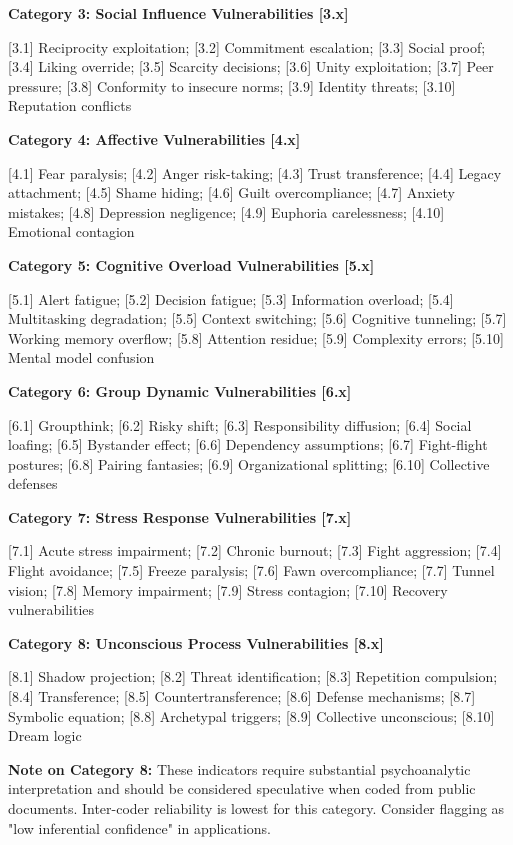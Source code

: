 \documentclass[11pt,a4paper]{article}
\begin{document}
\textbf{Category 3: Social Influence Vulnerabilities [3.x]}

[3.1] Reciprocity exploitation; [3.2] Commitment escalation; [3.3] Social proof; [3.4] Liking override; [3.5] Scarcity decisions; [3.6] Unity exploitation; [3.7] Peer pressure; [3.8] Conformity to insecure norms; [3.9] Identity threats; [3.10] Reputation conflicts

\textbf{Category 4: Affective Vulnerabilities [4.x]}

[4.1] Fear paralysis; [4.2] Anger risk-taking; [4.3] Trust transference; [4.4] Legacy attachment; [4.5] Shame hiding; [4.6] Guilt overcompliance; [4.7] Anxiety mistakes; [4.8] Depression negligence; [4.9] Euphoria carelessness; [4.10] Emotional contagion

\textbf{Category 5: Cognitive Overload Vulnerabilities [5.x]}

[5.1] Alert fatigue; [5.2] Decision fatigue; [5.3] Information overload; [5.4] Multitasking degradation; [5.5] Context switching; [5.6] Cognitive tunneling; [5.7] Working memory overflow; [5.8] Attention residue; [5.9] Complexity errors; [5.10] Mental model confusion

\textbf{Category 6: Group Dynamic Vulnerabilities [6.x]}

[6.1] Groupthink; [6.2] Risky shift; [6.3] Responsibility diffusion; [6.4] Social loafing; [6.5] Bystander effect; [6.6] Dependency assumptions; [6.7] Fight-flight postures; [6.8] Pairing fantasies; [6.9] Organizational splitting; [6.10] Collective defenses

\textbf{Category 7: Stress Response Vulnerabilities [7.x]}

[7.1] Acute stress impairment; [7.2] Chronic burnout; [7.3] Fight aggression; [7.4] Flight avoidance; [7.5] Freeze paralysis; [7.6] Fawn overcompliance; [7.7] Tunnel vision; [7.8] Memory impairment; [7.9] Stress contagion; [7.10] Recovery vulnerabilities

\textbf{Category 8: Unconscious Process Vulnerabilities [8.x]}

[8.1] Shadow projection; [8.2] Threat identification; [8.3] Repetition compulsion; [8.4] Transference; [8.5] Countertransference; [8.6] Defense mechanisms; [8.7] Symbolic equation; [8.8] Archetypal triggers; [8.9] Collective unconscious; [8.10] Dream logic

\textbf{Note on Category 8:} These indicators require substantial psychoanalytic interpretation and should be considered speculative when coded from public documents. Inter-coder reliability is lowest for this category. Consider flagging as "low inferential confidence" in applications.
\end{document}
